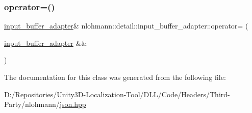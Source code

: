\subsubsection{\texorpdfstring{operator=()}{operator=()}\hspace{0.1cm}{\footnotesize\ttfamily [2/2]}}
{\footnotesize\ttfamily \mbox{\hyperlink{classnlohmann_1_1detail_1_1input__buffer__adapter}{input\+\_\+buffer\+\_\+adapter}}\& nlohmann\+::detail\+::input\+\_\+buffer\+\_\+adapter\+::operator= (\begin{DoxyParamCaption}\item[{\mbox{\hyperlink{classnlohmann_1_1detail_1_1input__buffer__adapter}{input\+\_\+buffer\+\_\+adapter}} \&\&}]{ }\end{DoxyParamCaption})\hspace{0.3cm}{\ttfamily [delete]}}



The documentation for this class was generated from the following file\+:\begin{DoxyCompactItemize}
\item 
D\+:/\+Repositories/\+Unity3\+D-\/\+Localization-\/\+Tool/\+D\+L\+L/\+Code/\+Headers/\+Third-\/\+Party/nlohmann/\mbox{\hyperlink{json_8hpp}{json.\+hpp}}\end{DoxyCompactItemize}
